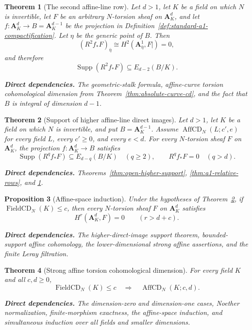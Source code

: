 \documentclass[10pt]{article}
\newtheorem{theorem}{Theorem}[section]
\newtheorem{proposition}[theorem]{Proposition}
\theoremstyle{definition}
\newcommand{\deps}[1]{\par\smallskip\noindent\textbf{Direct dependencies.} #1}
\begin{document}
\begin{theorem}[The second affine-line row]
\label{thm:a1-second-row}
Let $d>1$, let $K$ be a field on which $N$ is invertible, let $F$ be an
arbitrary $N$-torsion sheaf on $\mathbf A^d_K$, and let
$f:\mathbf A^d_K\to B=\mathbf A^{d-1}_K$ be the projection in
Definition~\ref{def:standard-a1-compactification}.
Let $\eta$ be the generic point of $B$.  Then
\[
 (R^2f_*F)_{\bar\eta}
 \cong H^2(\mathbf A^1_{\bar\eta},F|)=0,
\]
and therefore
\[
 \operatorname{Supp}(R^2f_*F)\subseteq E_{d-2}(B/K).
\]
\deps{The geometric-stalk formula, affine-curve torsion cohomological
dimension from Theorem~\ref{thm:absolute-curve-cd}, and the fact that $B$ is
integral of dimension $d-1$.}
\end{theorem}

\begin{theorem}[Support of higher affine-line direct images]
\label{thm:a1-higher-support}
Let $d>1$, let $K$ be a field on which $N$ is invertible, and put
$B=\mathbf A^{d-1}_K$.  Assume
$\operatorname{AffCD}_N(L;c',e)$ for every field $L$, every $c'\geq0$, and
every $e<d$.  For every $N$-torsion sheaf $F$ on $\mathbf A^d_K$, the
projection $f:\mathbf A^d_K\to B$ satisfies
\[
 \operatorname{Supp}(R^qf_*F)\subseteq E_{d-q}(B/K)\quad(q\geq2),
 \qquad
 R^qf_*F=0\quad(q>d).
\]
\deps{Theorems~\ref{thm:open-higher-support},
\ref{thm:a1-relative-rows}, and \ref{thm:a1-second-row}.}
\end{theorem}

\begin{proposition}[Affine-space induction]
\label{prop:affine-space-cd}
Under the hypotheses of Theorem~\ref{thm:a1-higher-support}, if
$\operatorname{FieldCD}_N(K)\leq c$, then every $N$-torsion sheaf $F$ on
$\mathbf A^d_K$ satisfies
\[
 H^r(\mathbf A^d_K,F)=0\qquad(r>d+c).
\]
\deps{The higher-direct-image support theorem, bounded-support affine
cohomology, the lower-dimensional strong affine assertions, and the finite
Leray filtration.}
\end{proposition}

\begin{theorem}[Strong affine torsion cohomological dimension]
\label{thm:strong-affine-cd}
For every field $K$ and all $c,d\geq0$,
\[
 \operatorname{FieldCD}_N(K)\leq c
 \quad\Longrightarrow\quad
 \operatorname{AffCD}_N(K;c,d).
\]
\deps{The dimension-zero and dimension-one cases, Noether normalization,
finite-morphism exactness, the affine-space induction, and simultaneous
induction over all fields and smaller dimensions.}
\end{theorem}
\end{document}
